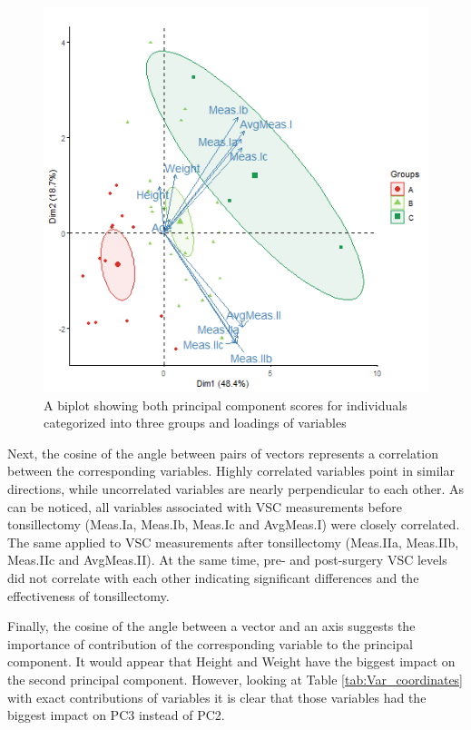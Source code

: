 \documentclass[12pt,a4paper,notitlepage]{report}
\begin{document}
\begin{figure}[!hb]
	\centering
	\includegraphics[width=\textwidth, height=.91\textwidth]{./Figures/Fig_3.3.3}
	\caption{A biplot showing both principal component scores for individuals categorized into three groups and loadings of variables}
	\label{fig:Fig_3.3}
\end{figure}	

Next, the cosine of the angle between pairs of vectors represents a correlation between the corresponding variables. Highly correlated variables point in similar directions, while uncorrelated variables are nearly perpendicular to each other. As can be noticed, all variables associated with VSC measurements before tonsillectomy (Meas.Ia, Meas.Ib, Meas.Ic and AvgMeas.I) were closely correlated. The same applied to VSC measurements after tonsillectomy (Meas.IIa, Meas.IIb, Meas.IIc and AvgMeas.II). At the same time, pre- and post-surgery VSC levels did not correlate with each other indicating significant differences and the effectiveness of tonsillectomy.
 
Finally, the cosine of the angle between a vector and an axis suggests the importance of contribution of the corresponding variable to the principal component. It would appear that Height and Weight have the biggest impact on the second principal component. However, looking at Table \ref{tab:Var_coordinates} with exact contributions of variables it is clear that those variables had the biggest impact on PC3 instead of PC2. 
    
\end{document}

